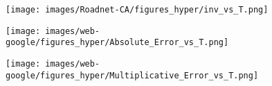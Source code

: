 \begin{figure*}[htbp]
\begin{subfigure}[b]{\textwidth}
\begin{minipage}[b]{0.3\textwidth}
			\texttt{[image: images/Roadnet-CA/figures\_hyper/inv\_vs\_T.png]} %
		\end{minipage}
	\end{subfigure}
	\begin{subfigure}[b]{\textwidth}
		\centering
		\begin{minipage}[b]{0.05\textwidth}
			\centering
		\end{minipage}%
		\begin{minipage}[b]{0.3\textwidth}
			\centering
			\texttt{[image: images/web-google/figures\_hyper/Absolute\_Error\_vs\_T.png]} %
			
		\end{minipage}%
		\begin{minipage}[b]{0.3\textwidth}
			\centering
			
			\texttt{[image: images/web-google/figures\_hyper/Multiplicative\_Error\_vs\_T.png]} %
			
		\end{minipage}%
		\begin{minipage}[b]{0.3\textwidth}
			\centering
			

\end{minipage}
\end{subfigure}
\end{figure*}
